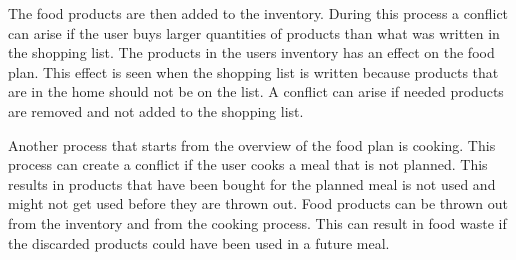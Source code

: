 The food products are then added to the inventory. During this process a conflict can arise if the user buys larger quantities of products than what was written in the shopping list. The products in the users inventory has an effect on the food plan. This effect is seen when the shopping list is written because products that are in the home should not be on the list. A conflict can arise if needed products are removed and not added to the shopping list. 

Another process that starts from the overview of the food plan is cooking. This process can create a conflict if the user cooks a meal that is not planned. This results in products that have been bought for the planned meal is not used and might not get used before they are thrown out. Food products can be thrown out from the inventory and from the cooking process. This can result in food waste if the discarded products could have been used in a future meal.      
   


      